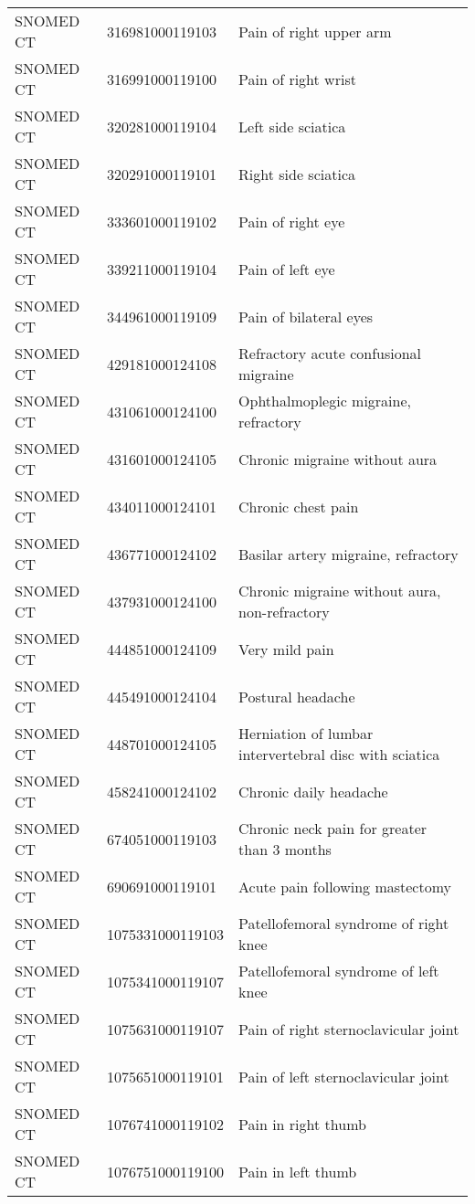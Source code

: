 \begin{longtable}{p{}p{}p{}}
  SNOMED CT & 316981000119103 & Pain of right upper arm \\ 
  SNOMED CT & 316991000119100 & Pain of right wrist \\ 
  SNOMED CT & 320281000119104 & Left side sciatica \\ 
  SNOMED CT & 320291000119101 & Right side sciatica \\ 
  SNOMED CT & 333601000119102 & Pain of right eye \\ 
  SNOMED CT & 339211000119104 & Pain of left eye \\ 
  SNOMED CT & 344961000119109 & Pain of bilateral eyes \\ 
  SNOMED CT & 429181000124108 & Refractory acute confusional migraine \\ 
  SNOMED CT & 431061000124100 & Ophthalmoplegic migraine, refractory \\ 
  SNOMED CT & 431601000124105 & Chronic migraine without aura \\ 
  SNOMED CT & 434011000124101 & Chronic chest pain \\ 
  SNOMED CT & 436771000124102 & Basilar artery migraine, refractory \\ 
  SNOMED CT & 437931000124100 & Chronic migraine without aura, non-refractory \\ 
  SNOMED CT & 444851000124109 & Very mild pain \\ 
  SNOMED CT & 445491000124104 & Postural headache \\ 
  SNOMED CT & 448701000124105 & Herniation of lumbar intervertebral disc with sciatica \\ 
  SNOMED CT & 458241000124102 & Chronic daily headache \\ 
  SNOMED CT & 674051000119103 & Chronic neck pain for greater than 3 months \\ 
  SNOMED CT & 690691000119101 & Acute pain following mastectomy \\ 
  SNOMED CT & 1075331000119103 & Patellofemoral syndrome of right knee \\ 
  SNOMED CT & 1075341000119107 & Patellofemoral syndrome of left knee \\ 
  SNOMED CT & 1075631000119107 & Pain of right sternoclavicular joint \\ 
  SNOMED CT & 1075651000119101 & Pain of left sternoclavicular joint \\ 
  SNOMED CT & 1076741000119102 & Pain in right thumb \\ 
  SNOMED CT & 1076751000119100 & Pain in left thumb \\ 

\end{longtable}
